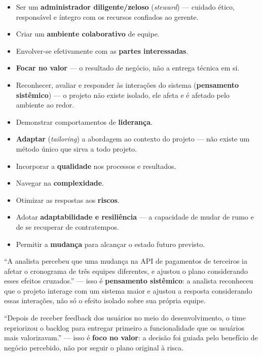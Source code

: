 \begin{conceito}[Os 12 princípios]
\begin{itemize}
\item Ser um \textbf{administrador diligente/zeloso} (\textit{steward}) ---
cuidado ético, responsável e íntegro com os recursos confiados ao gerente.
\item Criar um \textbf{ambiente colaborativo} de equipe.
\item Envolver-se efetivamente com as \textbf{partes interessadas}.
\item \textbf{Focar no valor} --- o resultado de negócio, não a entrega
técnica em si.
\item Reconhecer, avaliar e responder às interações do sistema
(\textbf{pensamento sistêmico}) --- o projeto não existe isolado, ele afeta
e é afetado pelo ambiente ao redor.
\item Demonstrar comportamentos de \textbf{liderança}.
\item \textbf{Adaptar} (\textit{tailoring}) a abordagem ao contexto do
projeto --- não existe um método único que sirva a todo projeto.
\item Incorporar a \textbf{qualidade} nos processos e resultados.
\item Navegar na \textbf{complexidade}.
\item Otimizar as respostas aos \textbf{riscos}.
\item Adotar \textbf{adaptabilidade e resiliência} --- a capacidade de
mudar de rumo e de se recuperar de contratempos.
\item Permitir a \textbf{mudança} para alcançar o estado futuro previsto.
\end{itemize}
\end{conceito}

\begin{exemplo}
“A analista percebeu que uma mudança na API de pagamentos de terceiros ia
afetar o cronograma de três equipes diferentes, e ajustou o plano
considerando esses efeitos cruzados.” --- isso é \textbf{pensamento
sistêmico}: a analista reconheceu que o projeto interage com um sistema
maior e ajustou a resposta considerando essas interações, não só o efeito
isolado sobre sua própria equipe.

“Depois de receber feedback dos usuários no meio do desenvolvimento, o time
repriorizou o backlog para entregar primeiro a funcionalidade que os
usuários mais valorizavam.” --- isso é \textbf{foco no valor}: a decisão foi
guiada pelo benefício de negócio percebido, não por seguir o plano original
à risca.
\end{exemplo}

